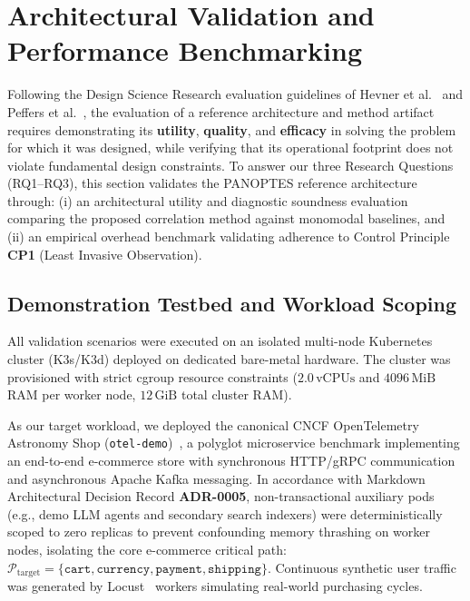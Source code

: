 \section{Architectural Validation and Performance Benchmarking}
\label{sec:evaluation}

Following the Design Science Research evaluation guidelines of Hevner et al.~\cite{hevner_2004} and Peffers et al.~\cite{peffers_2007}, the evaluation of a reference architecture and method artifact requires demonstrating its \textbf{utility}, \textbf{quality}, and \textbf{efficacy} in solving the problem for which it was designed, while verifying that its operational footprint does not violate fundamental design constraints. To answer our three Research Questions (RQ1--RQ3), this section validates the PANOPTES reference architecture through: (i) an architectural utility and diagnostic soundness evaluation comparing the proposed correlation method against monomodal baselines, and (ii) an empirical overhead benchmark validating adherence to Control Principle \textbf{CP1} (Least Invasive Observation).

\subsection{Demonstration Testbed and Workload Scoping}
All validation scenarios were executed on an isolated multi-node Kubernetes cluster (K3s/K3d) deployed on dedicated bare-metal hardware. The cluster was provisioned with strict cgroup resource constraints ($2.0\,\text{vCPUs}$ and $4096\,\text{MiB}$ RAM per worker node, $12\,\text{GiB}$ total cluster RAM). 

As our target workload, we deployed the canonical CNCF OpenTelemetry Astronomy Shop (\texttt{otel-demo})~\cite{opentelemetry_demo, wang2024building}, a polyglot microservice benchmark implementing an end-to-end e-commerce store with synchronous HTTP/gRPC communication and asynchronous Apache Kafka messaging. In accordance with Markdown Architectural Decision Record \textbf{ADR-0005}, non-transactional auxiliary pods (e.g., demo LLM agents and secondary search indexers) were deterministically scoped to zero replicas to prevent confounding memory thrashing on worker nodes, isolating the core e-commerce critical path: $\mathcal{P}_{\text{target}} = \{\texttt{cart}, \texttt{currency}, \texttt{payment}, \texttt{shipping}\}$. Continuous synthetic user traffic was generated by Locust~\cite{locust_framework} workers simulating real-world purchasing cycles.

